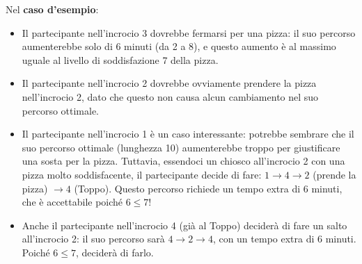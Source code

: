 \Explanations
Nel \textbf{caso d'esempio}:
\begin{itemize}
    \item Il partecipante nell'incrocio 3 dovrebbe fermarsi per una pizza: il suo percorso aumenterebbe solo di 6 minuti (da 2 a 8), e questo aumento è al massimo uguale al livello di soddisfazione 7 della pizza.
    \item Il partecipante nell'incrocio 2 dovrebbe ovviamente prendere la pizza nell'incrocio 2, dato che questo non causa alcun cambiamento nel suo percorso ottimale.
    \item Il partecipante nell'incrocio 1 è un caso interessante: potrebbe sembrare che il suo percorso ottimale (lunghezza 10) aumenterebbe troppo per giustificare una sosta per la pizza. Tuttavia, essendoci un chiosco all'incrocio 2 con una pizza molto soddisfacente, il partecipante decide di fare: $1 \to 4 \to 2$ (prende la pizza) $\to 4$ (Toppo). Questo percorso richiede un tempo extra di 6 minuti, che è accettabile poiché $6 \le 7$!
    \item Anche il partecipante nell'incrocio 4 (già al Toppo) deciderà di fare un salto all'incrocio 2: il suo percorso sarà $4 \to 2 \to 4$, con un tempo extra di 6 minuti. Poiché $6 \le 7$, deciderà di farlo.
\end{itemize}

